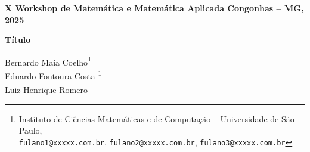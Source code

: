 \documentclass[12pt]{article}
\begin{document}
\pagestyle{empty} %


\begin{flushleft}
\tiny {\textbf{X Workshop de Matemática e Matemática Aplicada
\hspace{5,0cm} Congonhas -- MG, 2025}}\\
\vspace{-0.175cm}
\hrulefill
\end{flushleft}

\begin{center}
    {\Large \bf Título}\\
\end{center}


\begin{flushright}
    {\footnotesize Bernardo Maia Coelho}\footnote{\label{nota1} Instituto de
    Ciências Matemáticas e de Computação -- Universidade de São Paulo, \\
    \texttt{fulano1@xxxxx.com.br}, \texttt{fulano2@xxxxx.com.br},
    \texttt{fulano3@xxxxx.com.br}} \\
    {\footnotesize Eduardo Fontoura Costa}
    \hyperref[nota1]{\textsuperscript{\ref{nota1}}} \\
    {\footnotesize Luiz Henrique Romero}
    \hyperref[nota1]{\textsuperscript{\ref{nota1}}}
\end{flushright}
\vspace{.6cm}













%
%


\end{document}
